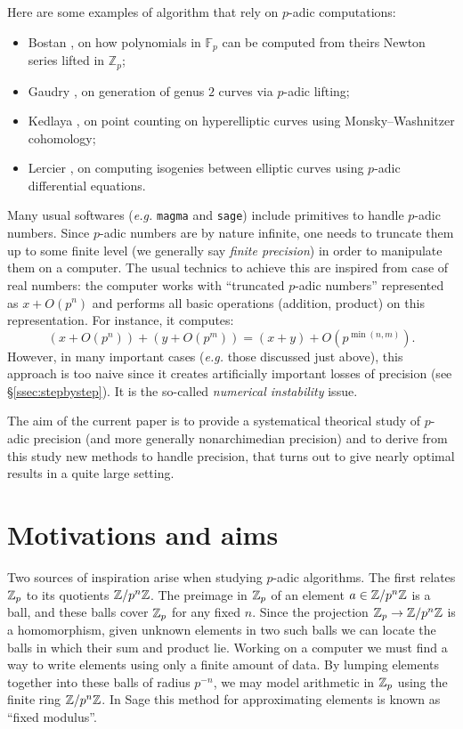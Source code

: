\documentclass{lms}
\begin{document}
Here are some examples of algorithm that rely on $p$-adic computations:
\begin{itemize}
\item Bostan \cite{Bostan}, on how polynomials in $\mathbb{F}_p$ can be computed from theirs Newton series lifted in $\mathbb{Z}_p$;
\item Gaudry \cite{Gaudry}, on generation of genus $2$ curves via $p$-adic lifting;
\item Kedlaya \cite{Kedlaya}, on point counting on hyperelliptic curves using Monsky--Washnitzer cohomology;
\item Lercier \cite{Lercier}, on computing isogenies between elliptic curves using $p$-adic differential equations.
\end{itemize}

Many usual softwares (\emph{e.g.} {\tt magma} and {\tt sage}) include 
primitives to handle $p$-adic numbers. Since $p$-adic numbers are by 
nature infinite, one needs to truncate them up to some finite level (we 
generally say \emph{finite precision}) in order to manipulate them on a 
computer. The usual technics to achieve this are inspired from case of 
real numbers: the computer works with ``truncated $p$-adic numbers'' 
represented as $x + O(p^n)$ and performs all basic operations (addition, 
product) on this representation. For instance, it computes: 
$$(x + O(p^n)) + (y + O(p^m)) = (x+y) + O(p^{\min(n,m)}).$$
However, in many important cases (\emph{e.g.} those discussed just 
above), this approach is too naive since it creates artificially 
important losses of precision (see \S\ref{ssec:stepbystep}). 
It is the so-called \emph{numerical instability} issue.

The aim of the current paper is to provide a systematical theorical 
study of $p$-adic precision (and more generally nonarchimedian 
precision) and to derive from this study new methods to handle 
precision, that turns out to give nearly optimal results in a quite 
large setting.

\section{Motivations and aims}

Two sources of inspiration arise when studying $p$-adic algorithms.
The first relates $\mathbb Z_p$ to its quotients $\mathbb Z/p^n\mathbb Z$.  The preimage in
$\mathbb Z_p$ of an element $a \in \mathbb Z / p^n \mathbb Z$ is a ball, and these balls cover
$\mathbb Z_p$ for any fixed $n$.  Since the projection $\mathbb Z_p \to \mathbb Z/p^n\mathbb Z$ is a
homomorphism, given unknown elements in two such balls we can
locate the balls in which their sum and product lie.  Working on a computer
we must find a way to write elements using only a finite amount of data.
By lumping elements together into these balls of radius $p^{-n}$, we may
model arithmetic in $\mathbb Z_p$ using the finite ring $\mathbb Z / p^n \mathbb Z$.  In Sage
this method for approximating elements is known as ``fixed modulus''.
\end{document}
